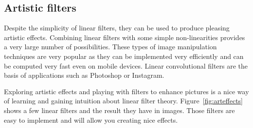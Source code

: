 





\subsection{Artistic filters}

Despite the simplicity of linear filters, they can be used to produce pleasing artistic effects. Combining linear filters with some simple non-linearities provides a very large number of possibilities. These types of image manipulation techniques are very popular as they can be implemented very efficiently and can be computed very fast even on mobile devices. Linear convolutional filters are the basis of applications such as Photoshop or Instagram. 

Exploring artistic effects and playing with filters to enhance pictures is a nice way of learning and gaining intuition about linear filter theory. Figure~\ref{fig:arteffects} shows a few linear filters and the result they have in images. Those filters are easy to implement and will allow you creating nice effects.

